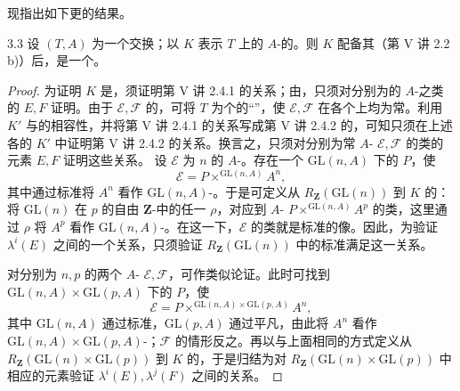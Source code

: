 现指出如下更的结果。
\begin{SGAresult}{}{3.3}
设 $(T,A)$ 为一个交换；以 $K$ 表示 $T$ 上的 $A$-的。则 $K$ 配备其（第 V 讲 2.2 b)）后，是一个。
\end{SGAresult}
\begin{proof}
为证明 $K$ 是，须证明第 V 讲 2.4.1 的关系；由，只须对分别为的 $A$-之类的 $E,F$ 证明。由于 $\mathcal E,\mathcal F$ 的，可将 $T$ 为个的“”，使 $\mathcal E,\mathcal F$ 在各个上均为常。利用 $K'$ 与的相容性，并将第 V 讲 2.4.1 的关系写成第 V 讲 2.4.2 的，可知只须在上述各的 $K'$ 中证明第 V 讲 2.4.2 的关系。换言之，只须对分别为常 $A$- $\mathcal E,\mathcal F$ 的类的元素 $E,F$ 证明这些关系。
设 $\mathcal E$ 为 $n$ 的 $A$-。存在一个 $\mathrm{GL}(n,A)$ 下的 $P$，使
\[
\mathcal E=P\mathbin{\times^{\mathrm{GL}(n,A)}}A^n,
\]
其中通过标准将 $A^n$ 看作 $\mathrm{GL}(n,A)$-。于是可定义从 $R_{\mathbf Z}(\mathrm{GL}(n))$ 到 $K$ 的：将 $\mathrm{GL}(n)$ 在 $p$ 的自由 $\mathbf Z$-中的任一 $\rho$，对应到 $A$- $P\mathbin{\times^{\mathrm{GL}(n,A)}}A^p$ 的类，这里通过 $\rho$ 将 $A^p$ 看作 $\mathrm{GL}(n,A)$-。在这一下，$\mathcal E$ 的类就是标准的像。因此，为验证 $\lambda^i(E)$ 之间的一个关系，只须验证 $R_{\mathbf Z}(\mathrm{GL}(n))$ 中的标准满足这一关系。

对分别为 $n,p$ 的两个 $A$- $\mathcal E,\mathcal F$，可作类似论证。此时可找到 $\mathrm{GL}(n,A)\times\mathrm{GL}(p,A)$ 下的 $P$，使
\[
\mathcal E=P\mathbin{\times^{\mathrm{GL}(n,A)\times\mathrm{GL}(p,A)}}A^n,
\]
其中 $\mathrm{GL}(n,A)$ 通过标准，$\mathrm{GL}(p,A)$ 通过平凡，由此将 $A^n$ 看作 $\mathrm{GL}(n,A)\times\mathrm{GL}(p,A)$-；$\mathcal F$ 的情形反之。再以与上面相同的方式定义从 $R_{\mathbf Z}(\mathrm{GL}(n)\times\mathrm{GL}(p))$ 到 $K$ 的，于是归结为对 $R_{\mathbf Z}(\mathrm{GL}(n)\times\mathrm{GL}(p))$ 中相应的元素验证 $\lambda^i(E),\lambda^j(F)$ 之间的关系。


\end{proof}
